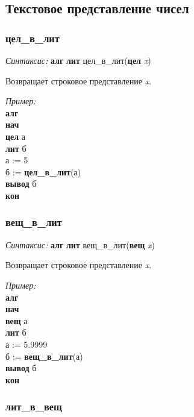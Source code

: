 \subsection{Текстовое представление чисел}
\label{text2num}

\subsubsection{цел\_в\_лит}

\emph{Синтаксис:} \textbf{алг} \textbf{лит} цел\_в\_лит(\textbf{цел} \emph{x})


      

        Возвращает строковое представление \emph{x}.
      
  
\emph{Пример:}
\sffamily
~\\\textbf{алг 
~\\нач
~\\цел} а
~\\\otstup \textbf{лит} б
~\\\otstup а := 5
~\\\otstup  б := \textbf{цел\_в\_лит}(а)
~\\\otstup \textbf{вывод} б
~\\\textbf{кон}



\normalfont
\subsubsection{вещ\_в\_лит}

\emph{Синтаксис:} \textbf{алг} \textbf{лит} вещ\_в\_лит(\textbf{вещ} \emph{x})


     

        Возвращает строковое представление \emph{x}.
      
\emph{Пример:}  
\sffamily
~\\\textbf{алг 
~\\нач
~\\\otstup вещ} а
~\\\otstup \textbf{лит} б
~\\\otstup а := 5.9999
~\\\otstup б := \textbf{вещ\_в\_лит}(а)
~\\\otstup \textbf{вывод} б
~\\\textbf{кон}



\normalfont
\subsubsection{лит\_в\_вещ}

